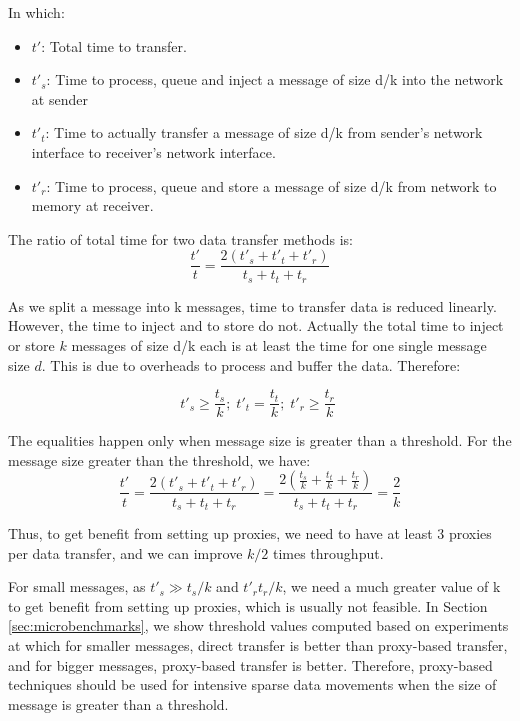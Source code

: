\documentclass[final,5p,times]{elsarticle}
\begin{document}
In which:
\begin{itemize}
\item $t'$: Total time to transfer.
\item $t'_s$: Time to process, queue and inject a message of size d/k into the network at sender
\item $t'_t$: Time to actually transfer a message of size d/k from sender's network interface to receiver's network interface.
\item $t'_r$: Time to process, queue and store a message of size d/k from network to memory at receiver.
\end{itemize}

The ratio of total time for two data transfer methods is:
\begin{equation}
\frac{t'}{t} = \frac{2(t'_s + t'_t + t'_r)}{t_s + t_t + t_r} 
\end{equation}

As we split a message into k messages, time to transfer data is reduced linearly. However, the time to inject and  to store do not. Actually the total time to inject or store $k$ messages of size d/k each is at least the time for one single message size $d$. This is due to overheads to process and buffer the data. Therefore:

\begin{equation}
t'_s \ge \frac{t_s}{k}; \; 
t'_t = \frac{t_t}{k}; \; 
t'_r \ge \frac{t_r}{k}\; 
\end{equation}

The equalities happen only when message size is greater than a threshold. For the message size greater than  the threshold, we have:
\begin{equation}
\frac{t'}{t} = \frac{2(t'_s + t'_t + t'_r)}{t_s + t_t + t_r} = \frac{2(\frac{t_s}{k} + \frac{t_t}{k} + \frac{t_r}{k})}{t_s + t_t + t_r} = \frac{2}{k}
\end{equation}

Thus, to get benefit from setting up proxies, we need to have at least 3 proxies per data transfer, and we can improve $k/2$ times throughput.

For small messages, as $t'_s \gg t_s/k$ and $t'_r t_r/k$, we need a much greater value of k to get benefit from setting up proxies, which is usually not feasible. In Section \ref{sec:microbenchmarks}, we show threshold values computed based on experiments at which for smaller messages, direct transfer is better than proxy-based transfer, and for bigger messages, proxy-based transfer is better. Therefore, proxy-based techniques should be used for intensive sparse data movements when the size of message is greater than a threshold.
\end{document}
